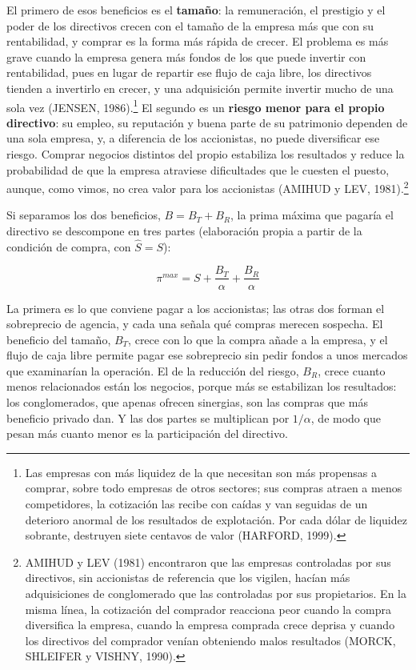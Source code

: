 \documentclass[10pt,a4paper]{article}
\begin{document}
El primero de esos beneficios es el \textbf{tamaño}: la remuneración, el prestigio y el poder de los directivos crecen con el tamaño de la empresa más que con su rentabilidad, y comprar es la forma más rápida de crecer. El problema es más grave cuando la empresa genera más fondos de los que puede invertir con rentabilidad, pues en lugar de repartir ese flujo de caja libre, los directivos tienden a invertirlo en crecer, y una adquisición permite invertir mucho de una sola vez (JENSEN, 1986).\footnote{%
    Las empresas con más liquidez de la que necesitan son más propensas a comprar, sobre todo empresas de otros sectores; sus compras atraen a menos competidores, la cotización las recibe con caídas y van seguidas de un deterioro anormal de los resultados de explotación. Por cada dólar de liquidez sobrante, destruyen siete centavos de valor (HARFORD, 1999).
} El segundo es un \textbf{riesgo menor para el propio directivo}: su empleo, su reputación y buena parte de su patrimonio dependen de una sola empresa, y, a diferencia de los accionistas, no puede diversificar ese riesgo. Comprar negocios distintos del propio estabiliza los resultados y reduce la probabilidad de que la empresa atraviese dificultades que le cuesten el puesto, aunque, como vimos, no crea valor para los accionistas (AMIHUD y LEV, 1981).\footnote{%
    AMIHUD y LEV (1981) encontraron que las empresas controladas por sus directivos, sin accionistas de referencia que los vigilen, hacían más adquisiciones de conglomerado que las controladas por sus propietarios. En la misma línea, la cotización del comprador reacciona peor cuando la compra diversifica la empresa, cuando la empresa comprada crece deprisa y cuando los directivos del comprador venían obteniendo malos resultados (MORCK, SHLEIFER y VISHNY, 1990).
}

Si separamos los dos beneficios, $B=B_T+B_R$, la prima máxima que pagaría el directivo se descompone en tres partes (elaboración propia a partir de la condición de compra, con $\hat S=S$):

$$\pi^{max}=S+\frac{B_T}{\alpha}+\frac{B_R}{\alpha}$$

La primera es lo que conviene pagar a los accionistas; las otras dos forman el sobreprecio de agencia, y cada una señala qué compras merecen sospecha. El beneficio del tamaño, $B_T$, crece con lo que la compra añade a la empresa, y el flujo de caja libre permite pagar ese sobreprecio sin pedir fondos a unos mercados que examinarían la operación. El de la reducción del riesgo, $B_R$, crece cuanto menos relacionados están los negocios, porque más se estabilizan los resultados: los conglomerados, que apenas ofrecen sinergias, son las compras que más beneficio privado dan. Y las dos partes se multiplican por $1/\alpha$, de modo que pesan más cuanto menor es la participación del directivo.
\end{document}
